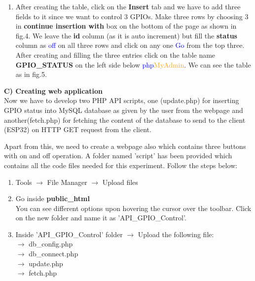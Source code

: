 \documentclass[12pt,a4paper]{article}
\begin{document}
\begin{justify}
\begin{enumerate}
\item After creating the table, click on the \textbf{Insert} tab and we have to add three fields to it since we want to control 3 GPIOs. Make three rows by choosing 3 in \textbf{continue insertion with} box on the bottom of the page as shown in fig.4. We leave the \textbf{id} column (as it is auto increment) but fill the \textbf{status} column as \textcolor{blue}{off} on all three rows and click on any one \textcolor{blue}{Go} from the top three. After creating and filling the three entries click on the table name \textbf{GPIO\_STATUS} on the left side below \textcolor{blue}{php}\textcolor{orange}{MyAdmin}. We can see the table as in fig.5.

\end{enumerate}



\noindent \textbf{C) Creating web application}\\[3pt]
Now we have to develop two PHP API scripts, one (update.php) for inserting GPIO status into MySQL database as given by the user from the webpage and another(fetch.php) for fetching the content of the database to send to the client (ESP32) on HTTP GET request from the client.\par

\noindent Apart from this, we need to create a webpage also which contains three buttons with on and off operation. A  folder named 'script' has been provided which contains all the code files needed for this experiment. Follow the steps below:

\vspace{-3mm}
\begin{enumerate}
\setlength\itemsep{-0.3em}
\item Tools $ \rightarrow $ File Manager $ \rightarrow $ Upload files
\item Go inside \textbf{public\_html}\\
You can see different options upon hovering the cursor over the toolbar. Click on the new folder and name it as 'API\_GPIO\_Control'.

\item Inside 'API\_GPIO\_Control' folder  $ \rightarrow $ Upload the following file:\\
$ \rightarrow $ db\_config.php\\
$ \rightarrow $ db\_connect.php\\
$ \rightarrow $ update.php\\
$ \rightarrow $ fetch.php\\


\end{enumerate}
\end{justify}
\end{document}
